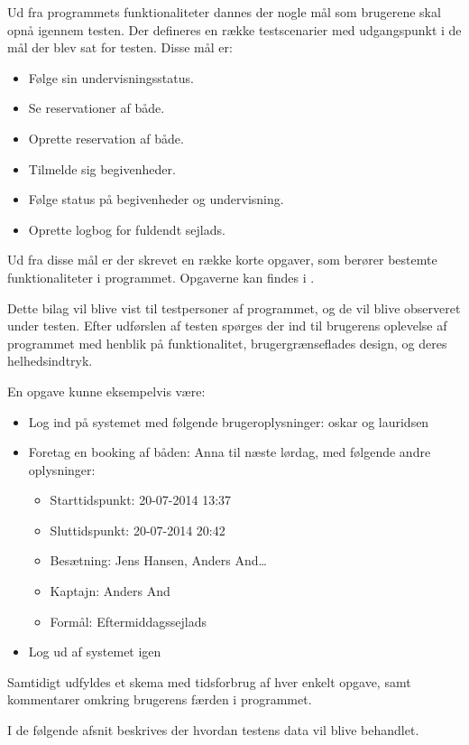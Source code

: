 Ud fra programmets funktionaliteter dannes der nogle mål som brugerene skal opnå igennem testen. 
Der defineres en række testscenarier med udgangspunkt i de mål der blev sat for testen.
Disse mål er:
\begin{itemize}
  \item Følge sin undervisningsstatus.
  \item Se reservationer af både.
  \item Oprette reservation af både.
  \item Tilmelde sig begivenheder.
  \item Følge status på begivenheder og undervisning.
  \item Oprette logbog for fuldendt sejlads.
\end{itemize}

Ud fra disse mål er der skrevet en række korte opgaver, som berører bestemte funktionaliteter i programmet. 
Opgaverne kan findes i .

Dette bilag vil blive vist til testpersoner af programmet, og de vil blive observeret under testen. 
Efter udførslen af testen spørges der ind til brugerens oplevelse af programmet med henblik på funktionalitet, brugergrænseflades design, og deres helhedsindtryk.

En opgave kunne eksempelvis være:
\begin{itemize}
	\item Log ind på systemet med følgende brugeroplysninger: oskar og lauridsen
	\item Foretag en booking af båden: Anna til næste lørdag, med følgende andre oplysninger: 
	\begin{itemize}
		\item Starttidspunkt: 20-07-2014 13:37
		\item Sluttidspunkt: 20-07-2014 20:42
		\item Besætning: Jens Hansen, Anders And\ldots
		\item Kaptajn: Anders And
		\item Formål: Eftermiddagssejlads
	\end{itemize}
	\item Log ud af systemet igen
\end{itemize}

Samtidigt udfyldes et skema med tidsforbrug af hver enkelt opgave, samt kommentarer omkring brugerens færden i programmet.

I de følgende afsnit beskrives der hvordan testens data vil blive behandlet.

